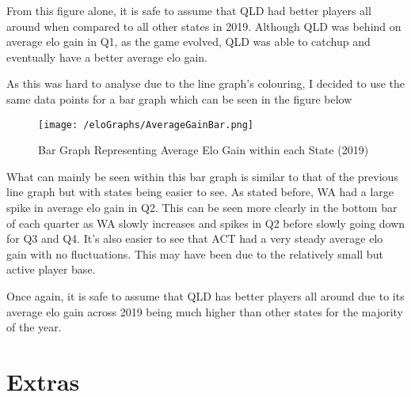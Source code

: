\documentclass[11pt, oneside, a4paper]{article}
\begin{document}
From this figure alone, it is safe to assume that QLD had better players all around when compared to all other states in 2019. Although QLD was behind on average elo gain in Q1, as the game evolved, QLD was able to catchup and eventually have a better average elo gain.

As this was hard to analyse due to the line graph's colouring, I decided to use the same data points for a bar graph which can be seen in the figure below

\newpage
\begin{figure}[!ht]
	\centerline{\texttt{[image: /eloGraphs/AverageGainBar.png]}}
	\caption{Bar Graph Representing Average Elo Gain within each State  (2019)}
	\label{fig:figure2}
\end{figure}

What can mainly be seen within this bar graph is similar to that of the previous line graph but with states being easier to see. As stated before, WA had a large spike in average elo gain in Q2. This can be seen more clearly in the bottom bar of each quarter as WA slowly increases and spikes in Q2 before slowly going down for Q3 and Q4. It's also easier to see that ACT had a very steady average elo gain with no fluctuations. This may have been due to the relatively small but active player base. 

Once again, it is safe to assume that QLD has better players all around due to its average elo gain across 2019 being much higher than other states for the majority of the year.

\newpage
\section{Extras}
\end{document}
